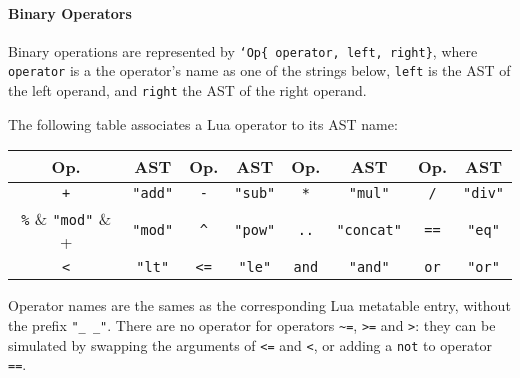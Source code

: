 \paragraph{Binary Operators}
Binary operations are represented by {\tt`Op\{ operator, left,
  right\}}, where \verb+operator+ is a the operator's name as one of
the strings below, \verb+left+ is the AST of the left operand, and
\verb+right+ the AST of the right operand.

The following table associates a Lua operator to its AST name:

\begin{center}
\begin{tabular}{|c|c||c|c||c|c||c|c|}
  \hline
  \bf Op. & \bf AST & 
  \bf Op. & \bf AST & 
  \bf Op. & \bf AST & 
  \bf Op. & \bf AST \\
  
  \hline\hline %
  \verb|+|   & \verb+"add"+    & 
  \verb+-+   & \verb+"sub"+    & 
  \verb+*+   & \verb+"mul"+    & 
  \verb+/+   & \verb+"div"+    \\
  \hline %
  \verb+%+   & \verb+"mod"+    & 
  \verb+^+   & \verb+"pow"+    & 
  \verb+..+  & \verb+"concat"+ & 
  \verb+==+  & \verb+"eq"+     \\
  \hline %
  \verb+<+   & \verb+"lt"+     &
  \verb+<=+  & \verb+"le"+     & 
  \verb+and+ & \verb+"and"+    & 
  \verb+or+  & \verb+"or"+     \\
  \hline %
\end{tabular}
\end{center}

Operator names are the sames as the corresponding Lua metatable entry,
without the prefix {\tt"\_\,\_"}. There are no operator for operators
\verb+~=+, \verb+>=+ and \verb+>+: they can be simulated by swapping
the arguments of \verb+<=+ and \verb+<+, or adding a \verb+not+ to
operator \verb+==+.

